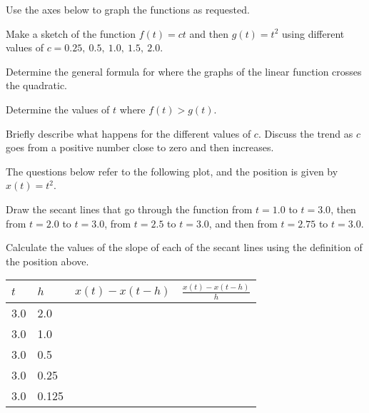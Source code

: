 \begin{problem}
\item Use the axes below to graph the functions as requested.

  \scalebox{0.7}{}

  \begin{subproblem}
  \item Make a sketch of the function $f(t)=c t$ and then $g(t)=t^2$
    using different values of $c=0.25,~0.5,~1.0,~1.5,~2.0$.
  \item Determine the general formula for where the graphs of the
    linear function crosses the quadratic.
    \vfill
  \item Determine the values of $t$ where $f(t)>g(t)$.
    \vfill
    \clearpage
  \item Briefly describe what happens for the different values of
    $c$. Discuss the trend as $c$ goes from a positive number close to
    zero and then increases.
    \vfill
  \end{subproblem}

  \clearpage

\item The questions below refer to the following plot, and the
  position is given by $x(t)=t^2$.
  \label{activity:3:graph}

  \scalebox{0.7}{}

  \begin{subproblem}
    \item Draw the secant lines that go through the function from
      $t=1.0$ to $t=3.0$, then from $t=2.0$ to $t=3.0$, from
      $t=2.5$ to $t=3.0$, and then from $t=2.75$ to $t=3.0$.
    \item Calculate the values of the slope of each of the secant
      lines using the definition of the position above.

      \begin{tabular}{l|l|l|l}
        $t$ & $h$   & $x(t)-x(t-h)$ & $\frac{x(t)-x(t-h)}{h}$ \\ \hline
        3.0 & 2.0   & & \\ [15pt]
        3.0 & 1.0   & & \\ [15pt]
        3.0 & 0.5   & & \\ [15pt]
        3.0 & 0.25  & & \\ [15pt]
        3.0 & 0.125 & & \\ [15pt]
      \end{tabular}


\end{subproblem}
\end{problem}
